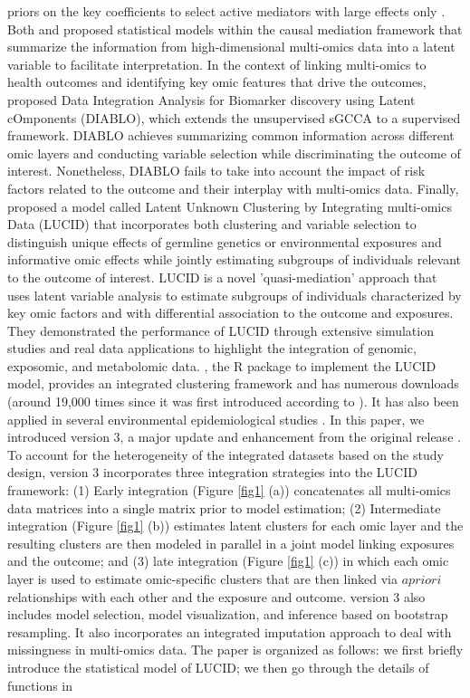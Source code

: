priors on the key coefficients to select active mediators with large effects only \citep{song2020bayesian}. Both \citet{albert2016causal} and \citet{derkach2019high} proposed statistical models within the causal mediation framework that summarize the information from high-dimensional multi-omics data into a latent variable to facilitate interpretation. 
In the context of linking multi-omics to health outcomes and identifying key omic features that drive the outcomes, \citet{singh2019diablo} proposed Data Integration Analysis for Biomarker discovery using Latent cOmponents (DIABLO), which extends the unsupervised sGCCA to a supervised framework. DIABLO achieves summarizing common information across different omic layers and conducting variable selection while discriminating the outcome of interest. Nonetheless, DIABLO fails to take into account the impact of risk factors related to the outcome and their interplay with multi-omics data. Finally, \citet{peng2020latent} proposed a model called Latent Unknown Clustering by Integrating multi-omics Data (LUCID) that incorporates both clustering and variable selection to distinguish unique effects of germline genetics or environmental exposures and informative omic effects while jointly estimating subgroups of individuals relevant to the outcome of interest. LUCID is a novel 'quasi-mediation' approach that uses latent variable analysis to estimate subgroups of individuals characterized by key omic factors and with differential association to the outcome and exposures. They demonstrated the performance of LUCID through extensive simulation studies and real data applications to highlight the integration of genomic, exposomic, and metabolomic data. , the R package to implement the LUCID model, provides an integrated clustering framework and has numerous downloads (around 19,000 times since it was first introduced according to  \citep{yu2022dlstats}). It has also been applied in several environmental epidemiological studies \citep{jin2020perfluoroalkyl, stratakis2020prenatal, matta2022associations}. In this paper, we introduced  version 3, a major update and enhancement from the original release \citep{LUCIDus}. To account for the heterogeneity of the integrated datasets based on the study design,  version 3 incorporates three integration strategies into the LUCID framework: (1) Early integration (Figure \ref{fig1} (a)) concatenates all multi-omics data matrices into a single matrix prior to model estimation; (2) Intermediate integration (Figure \ref{fig1} (b)) estimates latent clusters for each omic layer and the resulting clusters are then modeled in parallel in a joint model linking exposures and the outcome; and (3) late integration (Figure \ref{fig1} (c)) in which each omic layer is used to estimate omic-specific clusters that are then linked via $ a priori$ relationships with each other and the exposure and outcome.  version 3 also includes model selection, model visualization, and inference based on bootstrap resampling. It also incorporates an integrated imputation approach to deal with missingness in multi-omics data. The paper is organized as follows: we first briefly introduce the statistical model of LUCID; we then go through the details of functions in 